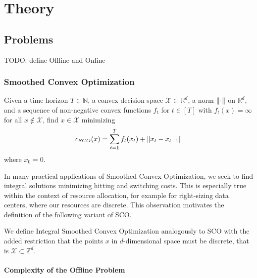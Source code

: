 
\chapter{Theory}\label{chapter:theory}

\section{Problems}

TODO: define Offline and Online

\subsection{Smoothed Convex Optimization}

\begin{problem}
Given a time horizon $T \in \mathbb{N}$, a convex decision space $\mathcal{X} \subset \mathbb{R}^d$, a norm $\lVert\cdot\rVert$ on $\mathbb{R}^d$, and a sequence of non-negative convex functions $f_t$ for $t \in [T]$ with $f_t(x) = \infty$ for all $x \not\in \mathcal{X}$, find $x \in \mathcal{X}$ minimizing \begin{align*}
    c_{SCO}(x) = \sum_{t=1}^T f_t(x_t) + \lVert x_t - x_{t-1}\rVert
\end{align*}
where $x_0 = 0$.
\end{problem}

In many practical applications of Smoothed Convex Optimization, we seek to find integral solutions minimizing hitting and switching costs. This is especially true within the context of resource allocation, for example for right-sizing data centers, where our resources are discrete. This observation motivates the definition of the following variant of SCO.

\begin{problem}
We define Integral Smoothed Convex Optimization analogously to SCO with the added restriction that the points $x$ in $d$-dimensional space must be discrete, that is $\mathcal{X} \subset \mathbb{Z}^d$.
\end{problem}

\subsubsection{Complexity of the Offline Problem}

